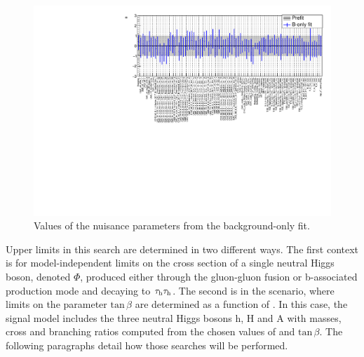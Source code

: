 \begin{figure}
    \centering
    \includegraphics[width=\textwidth]{Images/nuisances.pdf}
    \caption{Values of the nuisance parameters from the background-only fit.}
    \label{fig:nuisances}
\end{figure}


Upper limits in this search are determined in two different ways. The first context is for model-independent limits on the cross section of a single neutral Higgs boson, denoted $\Phi$, produced either through the gluon-gluon fusion or b-associated production mode and decaying to $\tau_{\rm h}\tau_{\rm h}$. The second is in the \mhmax scenario, where limits on the parameter  $\mathrm{tan}\,\beta$ are determined as a function of \ma. In this case, the signal model includes the three neutral Higgs bosons h, H and A with masses, cross and branching ratios computed from the chosen values of \ma and $\mathrm{tan}\,\beta$. The following paragraphs detail how those searches will be performed.


